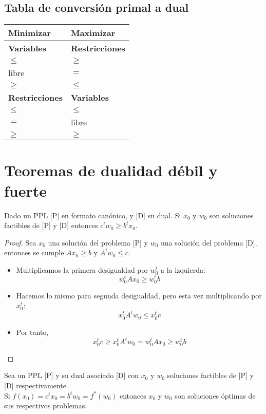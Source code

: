 \documentclass[11pt,fleqn]{book} %
\begin{document}
\subsection{Tabla de conversión primal a dual}

\begin{center}
  \begin{tabular}{| l | l |}
	\hline
	Minimizar & Maximizar \\ \hline \hline
	\textbf{Variables} & \textbf{Restricciones} \\ \hline
	$\leq$ & $\geq$ \\ \hline
	libre & $=$ \\ \hline
	$\geq$ & $\leq$ \\ \hline \hline
	\textbf{Restricciones} & \textbf{Variables} \\ \hline
	$\leq$ & $\leq$ \\ \hline
	$=$ & libre \\ \hline
	$\geq$ & $\geq$ \\ \hline
  \end{tabular}
\end{center}
\newpage
\section{Teoremas de dualidad débil y fuerte}
\begin{theorem}
  Dado un PPL [P] en formato canónico, y [D] su dual. Si $x_0$ y $w_0$ son soluciones factibles de [P] y [D] entonces $c^t w_0 \geq b^t x_0$.
\end{theorem}

\begin{proof}
  Sea $x_0$ una solución del problema [P] y $w_0$ una solución del problema [D], entonces se cumple $Ax_0 \geq b$ y $A^t w_0 \leq c$.
  \begin{itemize}
  \item Multiplicamos la primera desigualdad por $w_0^t$ a la izquierda: 
	$$ w_0^t A x_0 \geq w_0^t b $$
  \item Hacemos lo mismo para segunda desigualdad, pero esta vez multiplicando por $x_0^t$:
	$$ x_0^t A^t w_0 \leq x_0^t c $$
  \item Por tanto, 
	$$ x_0^t c \geq x_0^t A^t w_0 = w_0^t A x_0 \geq w_0^t b$$
  \end{itemize}
\end{proof}
\begin{theorem}
  Sea un PPL [P] y su dual asociado [D] con $x_0$ y $w_0$ soluciones factibles de [P] y [D] respectivamente. \\
  Si $f(x_0)=c^t x_0=b^t w_0=f^*(w_0)$ entonces $x_0$ y $w_0$ son soluciones óptimas de sus respectivos problemas.
\end{theorem}
\end{document}
